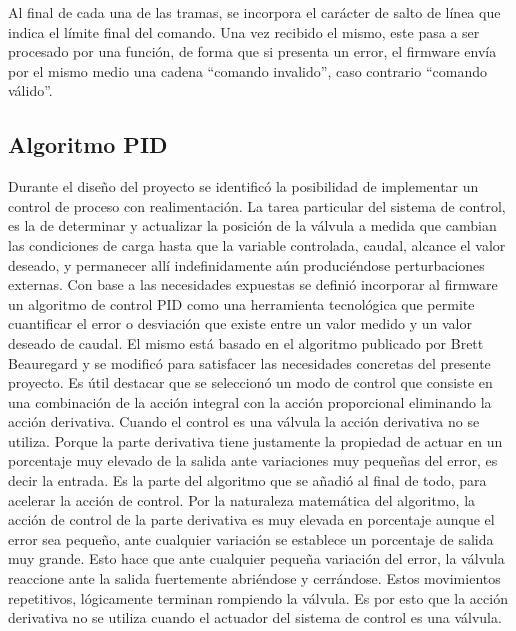 Al final de cada una de las tramas, se incorpora el carácter de salto de línea que indica el límite final del comando. Una vez recibido el mismo, este pasa a ser procesado por una función, de forma que si presenta un error, el firmware envía por el mismo medio una cadena “comando invalido”, caso contrario “comando válido”. 
\subsection{Algoritmo PID}
\label{subsec:Algoritmo PID}
Durante el diseño del proyecto se identificó la posibilidad de implementar un control de proceso con realimentación. La tarea particular del sistema de control, es la de determinar y actualizar la posición de la válvula a medida que cambian las condiciones de carga hasta que la variable controlada, caudal, alcance el valor deseado, y permanecer allí indefinidamente aún produciéndose perturbaciones externas. Con base a las necesidades expuestas se definió incorporar al firmware un algoritmo de control PID como una herramienta tecnológica que permite cuantificar el error o desviación que existe entre un valor medido y un valor deseado de caudal. El mismo está basado en el algoritmo publicado por Brett Beauregard y se modificó para satisfacer las necesidades concretas del presente proyecto. Es útil destacar que se seleccionó un modo de control que consiste en una combinación de la acción integral con la acción proporcional eliminando la acción derivativa.   
Cuando el control es una válvula la acción derivativa no se utiliza. Porque la parte derivativa tiene justamente la propiedad de actuar en un porcentaje muy elevado de la salida ante variaciones muy pequeñas del error, es decir la entrada. Es la parte del algoritmo que se añadió al final de todo, para acelerar la acción de control. Por la naturaleza matemática    del algoritmo, la acción de control de la parte derivativa es muy elevada en porcentaje aunque el error sea pequeño, ante cualquier variación se establece un porcentaje de salida muy grande. Esto hace que ante cualquier pequeña variación del error, la válvula reaccione ante la salida fuertemente abriéndose y cerrándose. Estos movimientos repetitivos, lógicamente terminan rompiendo la válvula. Es por esto que la acción derivativa no se utiliza cuando el actuador del sistema de control es una válvula. 

%
%
%
%
%
%	
%		
%
%		
%		
%		
%		
%
%
%

